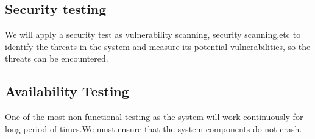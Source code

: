 \documentclass[12pt]{article}
\begin{document}
\subsection{Security testing}
We will apply a security test as vulnerability scanning, security scanning,etc to identify the threats in the system and measure its potential vulnerabilities, so the threats can be encountered.

\subsection{Availability Testing}
One of the most non functional testing as the system will work continuously for long period of times.We must ensure that the system components do not crash.
\end{document}
